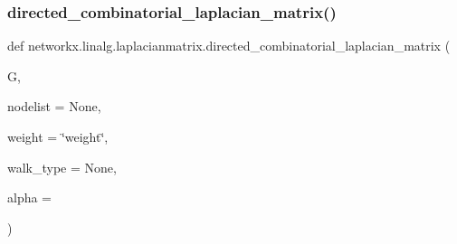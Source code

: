 \subsubsection{\texorpdfstring{directed\+\_\+combinatorial\+\_\+laplacian\+\_\+matrix()}{directed\_combinatorial\_laplacian\_matrix()}}
{\footnotesize\ttfamily def networkx.\+linalg.\+laplacianmatrix.\+directed\+\_\+combinatorial\+\_\+laplacian\+\_\+matrix (\begin{DoxyParamCaption}\item[{}]{G,  }\item[{}]{nodelist = {\ttfamily None},  }\item[{}]{weight = {\ttfamily \char`\"{}weight\char`\"{}},  }\item[{}]{walk\+\_\+type = {\ttfamily None},  }\item[{}]{alpha = {} }\end{DoxyParamCaption})}

